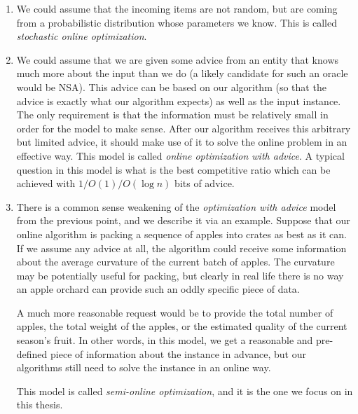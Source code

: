 \begin{enumerate}

\item We could assume that the incoming items are not random, but
are coming from a probabilistic distribution whose parameters we know.
This is called \textit{stochastic online optimization}.

\item We could assume that we are given some advice from an entity
that knows much more about the input than we do (a likely candidate
for such an oracle would be NSA). This advice can be based on our
algorithm (so that the advice is exactly what our algorithm expects)
as well as the input instance. The only requirement is that the
information must be relatively small in order for the model to make
sense. After our algorithm receives this arbitrary but limited advice,
it should make use of it to solve the online problem in an effective
way. This model is called \textit{online optimization with advice}. A
typical question in this model is what is the best competitive ratio
which can be achieved with $1/ O(1) / O(\log n)$ bits of advice.

\item There is a common sense weakening of the \textit{optimization
with advice} model from the previous point, and we describe it
via an example. Suppose that our online algorithm is packing a
sequence of apples into crates as best as it can. If we assume any
advice at all, the algorithm could receive some information about the
average curvature of the current batch of apples. The curvature may
be potentially useful for packing, but clearly in real life there is no
way an apple orchard can provide such an oddly specific piece of data.

A much more reasonable request would be to provide the total number of
apples, the total weight of the apples, or the estimated quality of
the current season's fruit. In other words, in this model, we get a
reasonable and pre-defined piece of information about the instance in
advance, but our algorithms still need to solve the instance in an
online way.

This model is called \textit{semi-online optimization}, and it is the
one we focus on in this thesis.


\end{enumerate}